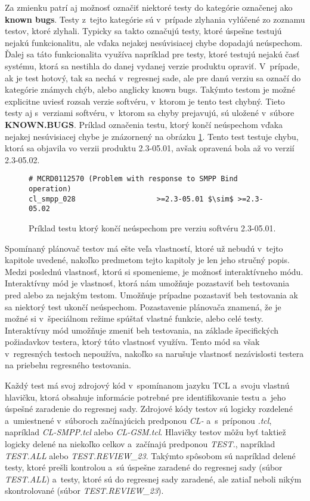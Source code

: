 Za zmienku patrí aj možnosť označiť niektoré testy do kategórie označenej ako \textbf{known bugs}.
Testy z~tejto kategórie sú v~prípade zlyhania vylúčené zo zoznamu testov, ktoré zlyhali.
Typicky sa takto označujú testy, ktoré úspešne testujú nejakú funkcionalitu, ale vďaka nejakej nesúvisiacej chybe 
dopadajú neúspechom. Ďalej sa táto funkcionalita využíva napríklad pre testy, ktoré testujú nejakú časť systému,
ktorá sa nestihla do danej vydanej verzie produktu opraviť. V~prípade, ak je test hotový, tak sa nechá v~regresnej sade,
ale pre danú verziu sa označí do kategórie známych chýb, alebo anglicky known bugs.
Takýmto testom je možné explicitne uviesť rozsah verzie softvéru, v~ktorom je tento test chybný.
Tieto testy aj s~verziami softvéru, v~ktorom sa chyby prejavujú, sú uložené v~súbore \textbf{KNOWN.BUGS}.
Príklad označenia testu, ktorý končí neúspechom vďaka nejakej nesúvisiacej chybe je znázornený na obrázku \ref{obrazok:known_bug}.
Tento test testuje chybu, ktorá sa objavila vo verzii produktu 2.3-05.01, avšak opravená bola až vo verzií 2.3-05.02. 

\begin{figure}[h]
\begin{lstlisting}[mathescape]
# MCRD0112570 (Problem with response to SMPP Bind operation)
cl_smpp_028                   >=2.3-05.01 $\sim$ >=2.3-05.02
\end{lstlisting}
\caption{Príklad testu ktorý končí neúspechom pre verziu softvéru 2.3-05.01.}
\label{obrazok:known_bug}
\end{figure}

Spomínaný plánovač testov má ešte veľa vlastností, ktoré už nebudú v~tejto kapitole uvedené, nakoľko predmetom tejto
kapitoly je len jeho stručný popis. Medzi poslednú vlastnosť, ktorú si spomenieme, je možnosť interaktívneho módu.
Interaktívny mód je vlastnosť, ktorá nám umožňuje pozastaviť beh testovania pred alebo za nejakým testom.
Umožňuje prípadne pozastaviť beh testovania ak sa niektorý test ukončí neúspechom. Pozastavenie plánovača znamená,
že je možné si v~špeciálnom režime spúštať vlastné funkcie, alebo celé testy.
Interaktívny mód umožňuje zmeniť beh testovania, na základe špecifických požiadavkov testera, ktorý túto vlastnosť využíva.
Tento mód sa však v~regresných testoch nepoužíva, nakoľko sa narušuje vlastnosť nezávislosti testera na priebehu regresného testovania.

Každý test má svoj zdrojový kód v~spomínanom jazyku TCL a~svoju vlastnú hlavičku, ktorá obsahuje informácie potrebné pre identifikovanie testu a~jeho úspešné zaradenie do regresnej sady.
Zdrojové kódy testov sú logicky rozdelené a~umiestnené v~súboroch začínajúcich predponou {\it CL-} a~s~príponou {\it .tcl}, napríklad {\it CL-SMPP.tcl} alebo {\it CL-GSM.tcl}.
Hlavičky testov môžu byť taktiež logicky delené na niekoľko celkov a~začínajú predponou {\it TEST.}, napríklad {\it TEST.ALL} alebo {\it TEST.REVIEW\_23}.
Takýmto spôsobom sú napríklad delené testy, ktoré prešli kontrolou a~sú úspešne zaradené do regresnej sady (súbor {\it TEST.ALL}) a~testy, ktoré sú do regresnej sady zaradené, ale
zatiaľ neboli nikým skontrolované (súbor {\it TEST.REVIEW\_23}).

